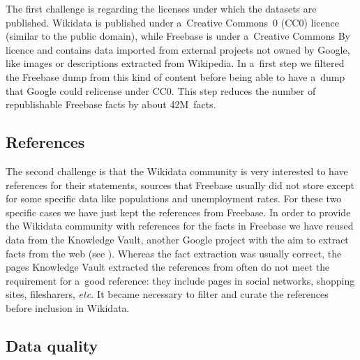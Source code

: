 \documentclass{sig-alternate}
\begin{document}
The first challenge is regarding the licenses under which the datasets are published.
Wikidata is published under a~Creative Commons~0 (CC0) licence (similar to the public domain),
while Freebase is under a~Creative Commons By licence and contains data
imported from external projects not owned by Google,
like images or descriptions extracted from Wikipedia.
In a~first step we filtered the Freebase dump from this kind of content
before being able to have a~dump that Google could relicense under CC0.
This step reduces the number of republishable Freebase facts by about 42M~facts.

\subsection{References}

The second challenge is that the Wikidata community is very interested to have references
for their statements, sources that Freebase usually did not store except for
some specific data like populations and unemployment rates.
For these two specific cases we have just kept the references from Freebase.
In order to provide the Wikidata community with references for the facts in Freebase
we have reused data from the Knowledge Vault, another Google project with the aim
to extract facts from the web (see \cite{dong2014knowledge}).
Whereas the fact extraction was usually correct, the pages Knowledge Vault extracted
the references from often do not meet the requirement for a~good reference:
they include pages in social networks, shopping sites, filesharers, \emph{etc.}
It became necessary to filter and curate the references before inclusion in Wikidata.

\subsection{Data quality}
\end{document}
